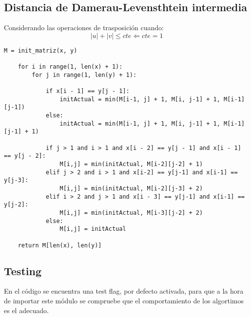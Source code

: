 \vfill
\subsection{Distancia de Damerau-Levensthtein intermedia}
Considerando las operaciones de trasposición cuando:
\begin{equation}
    |u| + |v| 	\leqslant cte \Leftarrow cte = 1
\end{equation}
\begin{lstlisting}[label={list:first},caption=Damerau-Levensthtein intermedio]
    M = init_matriz(x, y)

    for i in range(1, len(x) + 1):
        for j in range(1, len(y) + 1):

            if x[i - 1] == y[j - 1]:
                initActual = min(M[i-1, j] + 1, M[i, j-1] + 1, M[i-1][j-1])
            else:
                initActual = min(M[i-1, j] + 1, M[i, j-1] + 1, M[i-1][j-1] + 1)

            if j > 1 and i > 1 and x[i - 2] == y[j - 1] and x[i - 1] == y[j - 2]:
                M[i,j] = min(initActual, M[i-2][j-2] + 1)
            elif j > 2 and i > 1 and x[i-2] == y[j-1] and x[i-1] == y[j-3]:
                M[i,j] = min(initActual, M[i-2][j-3] + 2)
            elif i > 2 and j > 1 and x[i - 3] == y[j-1] and x[i-1] == y[j-2]:
                M[i,j] = min(initActual, M[i-3][j-2] + 2)
            else:
                M[i,j] = initActual

    return M[len(x), len(y)]
\end{lstlisting}

\subsection{Testing}
En el código se encuentra una test flag, por defecto activada, para que a la hora de importar este módulo se compruebe que el comportamiento de los algortimos es el adecuado.

\newpage